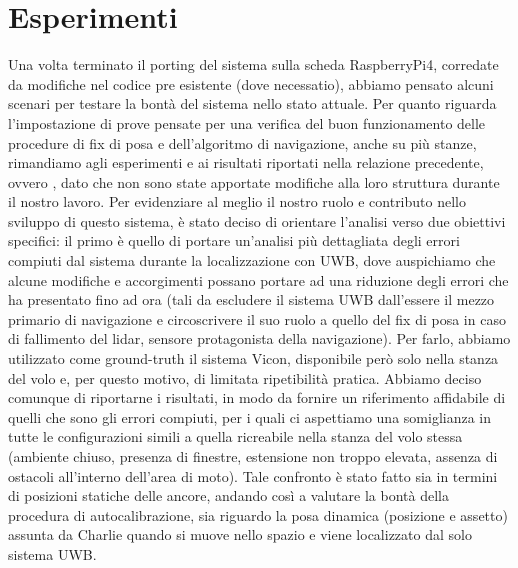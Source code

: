 \section{Esperimenti}

Una volta terminato il porting del sistema sulla scheda RaspberryPi4, corredate da modifiche nel codice pre esistente (dove necessatio), abbiamo pensato alcuni scenari per testare la bontà del sistema nello stato attuale. Per quanto riguarda l'impostazione di prove pensate per una verifica del buon funzionamento delle procedure di fix di posa e dell'algoritmo di navigazione, anche su più stanze, rimandiamo agli esperimenti e ai risultati riportati nella relazione precedente, ovvero \cite{ptvlocalizzazione}, dato che non sono state apportate modifiche alla loro struttura durante il nostro lavoro.
Per evidenziare al meglio il nostro ruolo e contributo nello sviluppo di questo sistema, è stato deciso di orientare l'analisi verso due obiettivi specifici: il primo è quello di portare un'analisi più dettagliata degli errori compiuti dal sistema durante la localizzazione con UWB, dove auspichiamo che alcune modifiche e accorgimenti possano portare ad una riduzione degli errori che ha presentato fino ad ora (tali da escludere il sistema UWB dall'essere il mezzo primario di navigazione e circoscrivere il suo ruolo a quello del fix di posa in caso di fallimento del lidar, sensore protagonista della navigazione). 
Per farlo, abbiamo utilizzato come ground-truth il sistema Vicon, disponibile però solo nella stanza del volo e, per questo motivo, di limitata ripetibilità pratica. Abbiamo deciso comunque di riportarne i risultati, in modo da fornire un riferimento affidabile di quelli che sono gli errori compiuti, per i quali ci aspettiamo una somiglianza in tutte le configurazioni simili a quella ricreabile nella stanza del volo stessa (ambiente chiuso, presenza di finestre, estensione non troppo elevata, assenza di ostacoli all'interno dell'area di moto). Tale confronto è stato fatto sia in termini di posizioni statiche delle ancore, andando così a valutare la bontà della procedura di autocalibrazione, sia riguardo la posa dinamica (posizione e assetto) assunta da Charlie quando si muove nello spazio e viene localizzato dal solo sistema UWB.

